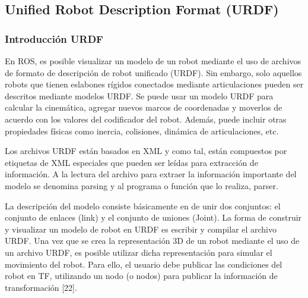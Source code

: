         
    \subsection{Unified Robot Description Format (URDF)}\label{cap2_urfdf}
    
        \subsubsection{Introducción URDF}
    
        En ROS, es posible visualizar un modelo de un robot mediante el uso de archivos de formato de descripción de robot unificado (URDF). Sin embargo, solo aquellos robots que tienen eslabones rígidos conectados mediante articulaciones pueden ser descritos mediante modelos URDF.  Se puede usar un modelo URDF para calcular la cinemática, agregar nuevos marcos de coordenadas y moverlos de acuerdo con los valores del codificador del robot. Además, puede incluir otras propiedades físicas como inercia, colisiones, dinámica de articulaciones, etc. 
        
        Los archivos URDF están basados en XML y como tal, están compuestos por etiquetas de XML especiales que pueden ser leídas para extracción de información. A la lectura del archivo para extraer la información importante del modelo se denomina parsing y al programa o función que lo realiza, parser.
        
        La descripción del modelo consiste básicamente en de unir dos conjuntos: el conjunto de enlaces (link) y el conjunto de uniones (Joint). La forma de construir y visualizar un modelo de robot en URDF es escribir y compilar el archivo URDF. Una vez que se crea la representación 3D de un robot mediante el uso de un archivo URDF, es posible utilizar dicha representación para simular el movimiento del robot. Para ello, el usuario debe publicar las condiciones del robot en TF, utilizando un nodo (o nodos) para publicar la información de transformación [22].
        
